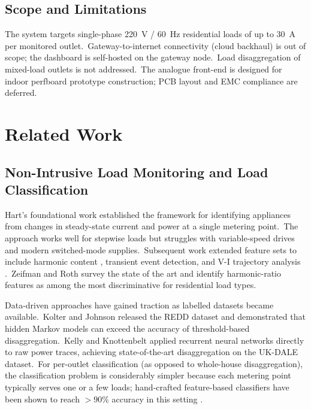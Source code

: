 \documentclass[conference]{IEEEtran}
\begin{document}
\subsection{Scope and Limitations}
\label{ssec:scope}

The system targets single-phase 220~V / 60~Hz residential loads of up
to 30~A per monitored outlet.\ Gateway-to-internet connectivity
(cloud backhaul) is out of scope; the dashboard is self-hosted on the
gateway node.\ Load disaggregation of mixed-load outlets is not
addressed.\ The analogue front-end is designed for indoor perfboard
prototype construction; PCB layout and EMC compliance are deferred.

\section{Related Work}
\label{sec:related}

\subsection{Non-Intrusive Load Monitoring and Load Classification}

Hart's foundational work \cite{hart_nilm_1992} established the
framework for identifying appliances from changes in steady-state
current and power at a single metering point.\ The approach works well
for stepwise loads but struggles with variable-speed drives and
modern switched-mode supplies.\ Subsequent work extended feature sets
to include harmonic content \cite{wichakool_harmonic_loads_2009},
transient event detection, and V-I trajectory analysis
\cite{lam_vI_trajectory_2007}.\ Zeifman and Roth
\cite{zeifman_nilm_review_2011} survey the state of the art and
identify harmonic-ratio features as among the most discriminative for
residential load types.

Data-driven approaches have gained traction as labelled datasets
became available.\ Kolter and Johnson \cite{kolter_redd_2011}
released the REDD dataset and demonstrated that hidden Markov models
can exceed the accuracy of threshold-based disaggregation.\ Kelly and
Knottenbelt \cite{kelly_neural_nilm_2015} applied recurrent neural
networks directly to raw power traces, achieving state-of-the-art
disaggregation on the UK-DALE dataset.\ For per-outlet classification
(as opposed to whole-house disaggregation), the classification problem
is considerably simpler because each metering point typically
serves one or a few loads; hand-crafted feature-based classifiers
have been shown to reach \(>90\%\) accuracy in this setting
\cite{parson_unsupervised_nilm_2012}.
\end{document}
